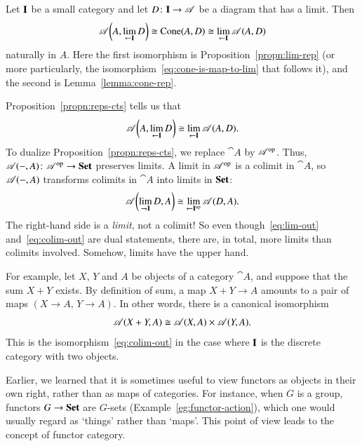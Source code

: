 \begin{pf}
Let $\mathbf{I}$ be a small category and let $D\from \scat{I} \to \cat{A}$ be a
diagram that has a limit.  Then
\[
\mathscr{A}\biggl(A, \lim\limits_{\leftarrow \mathbf{I}} D\biggr)
\cong
\operatorname{Cone}(A, D)
\cong
\lim\limits_{\leftarrow \mathbf{I}} \mathscr{A}(A, D)
\]
naturally in $A$.  Here the first isomorphism is
Proposition~\ref{propn:lim-rep} (or more particularly, the
isomorphism~\eqref{eq:cone-is-map-to-lim} that follows it), and the second is
Lemma~\ref{lemma:cone-rep}.
\end{pf}

\begin{remark}
\label{rmk:rep-pres}
Proposition~\ref{propn:reps-cts} tells us that
%
\begin{equation}
\label{eq:lim-out}
\cat{A} \biggl(A, \lt{\scat{I}} D\biggr)
\iso
\lt{\scat{I}} \cat{A}(A, D).
%
\index{limit!map into}
%
\end{equation}
%
To dualize Proposition~\ref{propn:reps-cts}, we replace $\cat{A}$ by
$\mathscr{A}^{\mathrm{op}}$.  Thus, $\cat{A}(\dashbk, A)\from \cat{A}^\op \to \Set$
preserves limits.  A limit in $\mathscr{A}^{\mathrm{op}}$ is a colimit in $\cat{A}$, so
$\mathscr{A}(-, A)$ transforms colimits in $\cat{A}$ into limits in
$\mathbf{Set}$:
%
\begin{equation}
\label{eq:colim-out}
\cat{A}\biggl(\colt{\scat{I}} D, A\biggr)
\iso
\lt{\scat{I}^{\op}} \cat{A}(D, A).
%
\index{colimit!map out of}
%
\end{equation}
%
The right-hand side is a \emph{limit}, not%
%
%
a colimit!  So even though~\eqref{eq:lim-out} and~\eqref{eq:colim-out} are
dual statements, there are, in total, more limits than colimits involved.
Somehow, limits have the upper hand.

For example, let $X$, $Y$ and $A$ be objects of a category $\cat{A}$, and
suppose that the sum $X + Y$ exists.  By definition of sum, a map $X + Y
\to A$%
%
%
amounts to a pair of maps $(X \to A,\, Y \to A)$.  In other words, there is
a canonical isomorphism
\[
\mathscr{A}(X + Y, A)
\cong
\mathscr{A}(X, A) \times \mathscr{A}(Y, A).
\]
This is the isomorphism~\eqref{eq:colim-out} in the case where $\mathbf{I}$ is
the discrete category with two objects.%
%
%
\end{remark}


%
%
%
%

Earlier, we learned that it is sometimes useful to view functors as objects
in their own right, rather than as maps of categories.  For instance, when
$G$ is a group, functors $G \to \mathbf{Set}$ are $G$-sets
(Example~\ref{eg:functor-action}), which one would usually regard as
`things' rather than `maps'.  This point of view leads to the concept of
functor category.


